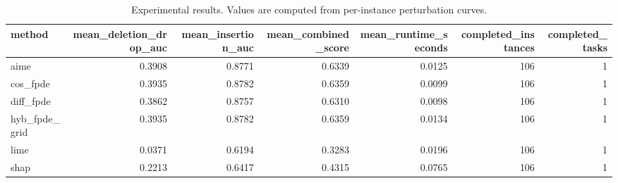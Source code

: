 \begin{table}[t]
\caption{Experimental results. Values are computed from per-instance perturbation curves.}
\label{tab:main_results_computed}
\centering
\begin{tabular}{lrrrrrr}
\toprule
method & mean\_deletion\_drop\_auc & mean\_insertion\_auc & mean\_combined\_score & mean\_runtime\_seconds & completed\_instances & completed\_tasks \\
\midrule
aime & 0.3908 & 0.8771 & 0.6339 & 0.0125 & 106 & 1 \\
cos\_fpde & 0.3935 & 0.8782 & 0.6359 & 0.0099 & 106 & 1 \\
diff\_fpde & 0.3862 & 0.8757 & 0.6310 & 0.0098 & 106 & 1 \\
hyb\_fpde\_grid & 0.3935 & 0.8782 & 0.6359 & 0.0134 & 106 & 1 \\
lime & 0.0371 & 0.6194 & 0.3283 & 0.0196 & 106 & 1 \\
shap & 0.2213 & 0.6417 & 0.4315 & 0.0765 & 106 & 1 \\
\bottomrule
\end{tabular}

\end{table}
